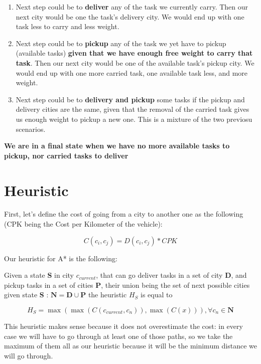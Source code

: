 \documentclass[fontsize=12pt]{scrartcl} %
\begin{document}
\begin{enumerate}

\item Next step could be to \textbf{deliver} any of the task we currently carry. Then our next city would be one the task's delivery city. We would end up with one task less to carry and less weight.

\item Next step could be to \textbf{pickup} any of the task we yet have to pickup (available tasks) \textbf{given that we have enough free weight to carry that task}. Then our next city would be one of the available task's pickup city. We would end up with one more carried task, one available task less, and more weight.
\item Next step could be to \textbf{delivery and pickup} some tasks if the pickup and delivery cities are the same, given that the removal of the carried task gives us enough weight to pickup a new one. This is a mixture of the two previosu scenarios.

\end{enumerate}


\textbf{We are in a final state when we have no more available tasks to pickup, nor carried tasks to deliver}


\section*{Heuristic}

First, let's define the cost of going from a city to another one as the following (CPK being the Cost per Kilometer of the vehicle): 

$$ C(c_i, c_j) = D(c_i, c_j) * CPK $$


Our heuristic for A* is the following:

Given a state \textbf{S} in city $c_{current}$, that can go deliver tasks in a set of city \textbf{D}, and pickup tasks in a set of cities \textbf{P}, their union being the set of next possible cities given state \textbf{S} : $\textbf{N} = \textbf{D} \cup \textbf{P}$ the heuristic $H_S$ is equal to 

$$ H_S = \max(\max(C(c_{current}, c_n)), \max(C(x)) ), \forall c_n \in \textbf{N} $$


This heuristic makes sense because it does not overestimate the cost: in every case we will have to go through at least one of those paths, so we take the maximum of them all as our heuristic because it will be the minimum distance we will go through. \\ \\
\end{document}
